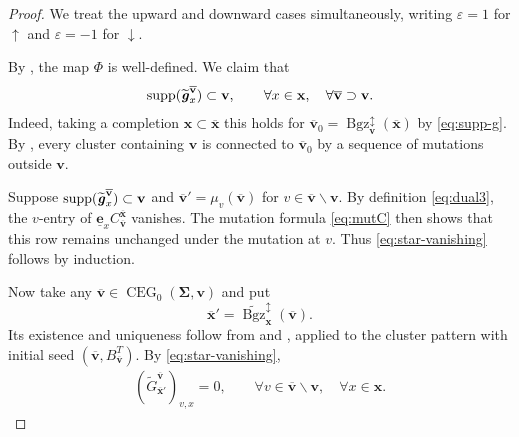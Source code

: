 \documentclass[11pt,reqno]{amsart}
\theoremstyle{plain}
\theoremstyle{definition}
\numberwithin{equation}{section}
\newcommand\<{\langle}
\renewcommand\>{\rangle}
\newcommand{\CEG}{\operatorname{CEG}} %
\newcommand{\on}[1]{\operatorname{#1}}
\def\vv{\mathbf{v}}
\def\uu{\mathbf{u}}
\newcommand{\bfit}[1]{\textbf{\textit{#1}}}
\newcommand{\ubf}[1]{\underline{\mathbf{#1}}}
\def\seeds{\mathbf{\Sigma}}
\def\xx{\mathbf{x}}%
\def\gvec{\bfit{g}}
\def\Cmat{{C}}
\def\Gmat{{G}}
\def\supp{\on{supp}}
\newcommand{\Bgzpm}[2]{\operatorname{Bgz}^{\updownarrow}_{#2}(#1)}
\newcommand{\tBgzpm}[2]{\widetilde{\operatorname{Bgz}}^{\updownarrow}_{#2}(#1)}
\newcommand{\ol}[1]{\overline{#1}}
\def\tgvec{\widetilde{\gvec}}
\begin{document}
\begin{proof}
We treat the upward and downward cases simultaneously,
writing $\varepsilon=1$ for $\uparrow$ and
$\varepsilon=-1$ for $\downarrow$.

By , the map $\Phi$ is well-defined.
We claim that
\begin{gather}\label{eq:star-vanishing}
    \supp(\tgvec^{\ol{\vv}}_x)\subset\vv,
    \qquad
    \forall x\in\xx,\quad
    \forall\ol{\vv}\supset\vv.
\end{gather}
Indeed, taking a completion $\xx\subset\ol{\xx}$ this holds for $\ol{\vv}_0=\Bgzpm{\ol{\xx}}{\vv}$ by \eqref{eq:supp-g}.
By \cite[Thm.~10]{CL2}, every cluster containing $\vv$ is connected to $\ol{\vv}_0$ by a sequence of mutations outside $\vv$.

Suppose $\supp(\tgvec^{\ol{\vv}}_x)\subset\vv$ and $\ol{\vv}'=\mu_v(\ol{\vv})$ for $v\in\ol{\vv}\backslash\vv$.
By definition \eqref{eq:dual3},
the $v$-entry of $\ubf{e}_x\Cmat^{\ol{\xx}}_{\ol{\vv}}$ vanishes.
The mutation formula \eqref{eq:mutC} then shows that this row remains unchanged under the mutation at $v$.
Thus \eqref{eq:star-vanishing} follows by induction.

Now take any $\ol{\vv}\in\CEG_0(\seeds,\vv)$ and put
\[
    \ol{\xx}'=
    \tBgzpm{\ol{\vv}}{\xx}.
\]
Its existence and uniqueness follow from  and , applied to the cluster pattern with initial seed $(\ol{\vv},B_{\ol{\vv}}^T)$.
By \eqref{eq:star-vanishing},
\begin{gather}\label{eq:star-zero}
    (\widetilde{\Gmat}^{\ol{\vv}}_{\ol{\xx}'})_{v,x}=0,
    \qquad
    \forall v\in\ol{\vv}\backslash\vv,\quad
    \forall x\in\xx.
\end{gather}


\end{proof}
\end{document}
